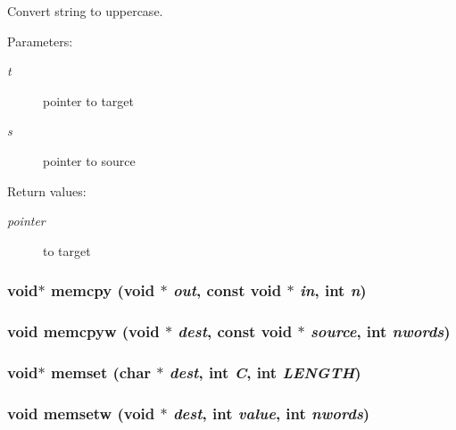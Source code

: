 Convert string to uppercase.

\begin{Desc}
\item[Parameters: ]\par
\begin{description}
\item[{\em 
t}]pointer to target \item[{\em 
s}]pointer to source \end{description}
\end{Desc}
\begin{Desc}
\item[Return values: ]\par
\begin{description}
\item[{\em 
pointer}]to target \end{description}
\end{Desc}
\subsubsection{\setlength{\rightskip}{0pt plus 5cm}void$\ast$ memcpy (void $\ast$ {\em out}, const void $\ast$ {\em in}, int {\em n})}\label{hpstring_8h_a27}


\subsubsection{\setlength{\rightskip}{0pt plus 5cm}void memcpyw (void $\ast$ {\em dest}, const void $\ast$ {\em source}, int {\em nwords})}\label{hpstring_8h_a28}


\subsubsection{\setlength{\rightskip}{0pt plus 5cm}void$\ast$ memset (char $\ast$ {\em dest}, int {\em C}, int {\em LENGTH})}\label{hpstring_8h_a29}


\subsubsection{\setlength{\rightskip}{0pt plus 5cm}void memsetw (void $\ast$ {\em dest}, int {\em value}, int {\em nwords})}\label{hpstring_8h_a30}


